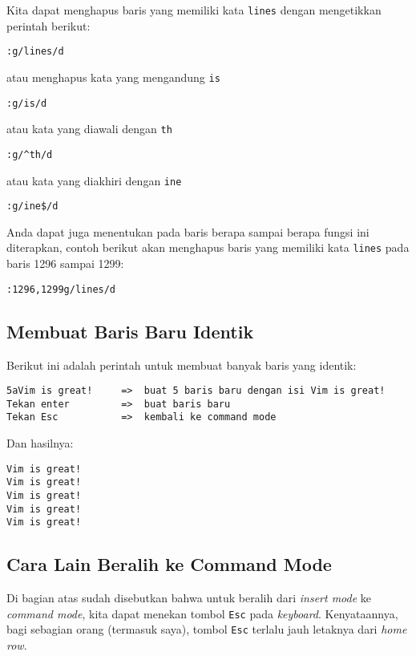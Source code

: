 \documentclass{article}
\begin{document}
Kita dapat menghapus baris yang memiliki kata \verb=lines=
dengan mengetikkan perintah berikut:

\begin{verbatim}
:g/lines/d
\end{verbatim}

atau menghapus kata yang mengandung \verb=is=

\begin{verbatim}
:g/is/d
\end{verbatim}

atau kata yang diawali dengan \verb=th=

\begin{verbatim}
:g/^th/d
\end{verbatim}

atau kata yang diakhiri dengan \verb=ine=

\begin{verbatim}
:g/ine$/d
\end{verbatim}

Anda dapat juga menentukan pada baris berapa sampai berapa
fungsi ini diterapkan, contoh berikut akan menghapus baris
yang memiliki kata \verb=lines= pada baris 1296 sampai 1299:

\begin{verbatim}
:1296,1299g/lines/d
\end{verbatim}

\subsection{Membuat Baris Baru Identik}
Berikut ini adalah perintah untuk membuat banyak baris yang
identik:

\begin{verbatim}
5aVim is great!     =>  buat 5 baris baru dengan isi Vim is great!
Tekan enter         =>  buat baris baru
Tekan Esc           =>  kembali ke command mode
\end{verbatim}

Dan hasilnya:

\begin{verbatim}
Vim is great!
Vim is great!
Vim is great!
Vim is great!
Vim is great!
\end{verbatim}

\subsection{Cara Lain Beralih ke Command Mode}
Di bagian atas sudah disebutkan bahwa untuk beralih dari
\emph{insert mode} ke \emph{command mode}, kita dapat
menekan tombol \verb=Esc= pada \emph{keyboard}.
Kenyataannya, bagi sebagian orang (termasuk saya), tombol
\verb=Esc= terlalu jauh letaknya dari \emph{home row}.
\end{document}
